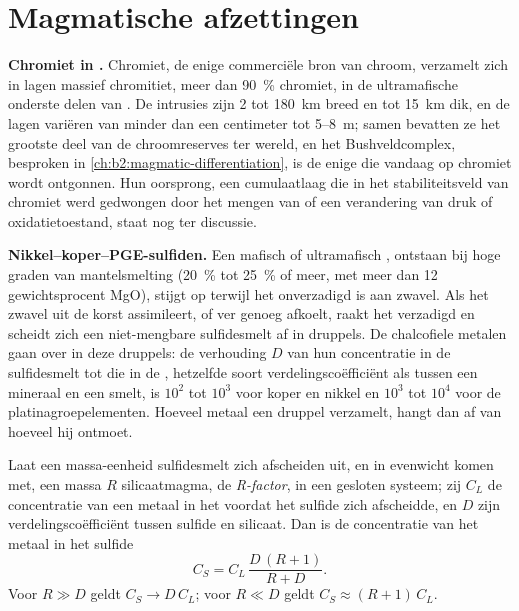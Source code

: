 \section{Magmatische afzettingen}\label{sec:b2:ore-deposits:magmatic}

\textbf{Chromiet in .} Chromiet, de enige commerciële bron van chroom,
verzamelt zich in lagen massief chromitiet, meer dan \qty{90}{\percent} chromiet, in de ultramafische
onderste delen van . De intrusies zijn 2 tot \qty{180}{km} breed en tot
\qty{15}{km} dik, en de lagen variëren van minder dan een centimeter tot 5--\qty{8}{m}; samen
bevatten ze het grootste deel van de chroomreserves ter wereld, en het Bushveldcomplex, besproken in
\cref{ch:b2:magmatic-differentiation}, is de enige die vandaag op chromiet wordt ontgonnen. Hun oorsprong, een
cumulaatlaag die in het stabiliteitsveld van chromiet werd gedwongen door het mengen van  of een verandering van druk of
oxidatietoestand, staat nog ter discussie.

\textbf{Nikkel--koper--PGE-sulfiden.} Een mafisch of ultramafisch , ontstaan bij hoge graden van
mantelsmelting (\qty{20}{\percent} tot \qty{25}{\percent} of meer, met meer dan 12 gewichtsprocent MgO),
stijgt op terwijl het onverzadigd is aan zwavel. Als het zwavel uit de korst assimileert, of ver
genoeg afkoelt, raakt het verzadigd en scheidt zich een niet-mengbare sulfidesmelt af in druppels. De
chalcofiele metalen gaan over in deze druppels: de verhouding $D$ van hun concentratie in de
sulfidesmelt tot die in de , hetzelfde soort verdelingscoëfficiënt als tussen een
mineraal en een smelt, is $10^2$ tot $10^3$ voor koper en nikkel en $10^3$ tot $10^4$ voor de
platinagroepelementen. Hoeveel metaal een druppel verzamelt, hangt dan af van hoeveel  hij ontmoet.

\begin{proposition}[R-factor]\label{prop:b2:ore-deposits:r-factor}
Laat een massa-eenheid sulfidesmelt zich afscheiden uit, en in evenwicht komen met, een massa $R$
silicaatmagma, de \emph{R-factor}, in een gesloten systeem; zij $C_L$ de concentratie van een
metaal in het  voordat het sulfide zich afscheidde, en $D$ zijn verdelingscoëfficiënt tussen sulfide en silicaat.
Dan is de concentratie van het metaal in het sulfide
\begin{equation}
C_S = C_L\,\frac{D\,(R + 1)}{R + D} .
\label{eq:b2:ore-deposits:r-factor}
\end{equation}
Voor $R \gg D$ geldt $C_S \to D\,C_L$; voor $R \ll D$ geldt $C_S \approx (R + 1)\,C_L$.
\end{proposition}

